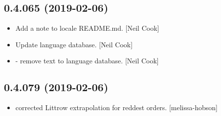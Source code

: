 \documentclass[a4paper,10pt,english]{report}
\begin{document}
\subsection{0.4.065 (2019-02-06)}
\label{\detokenize{misc/changelog:id193}}\begin{itemize}
\item {} 
Add a note to locale README.md. {[}Neil Cook{]}

\item {} 
Update language database. {[}Neil Cook{]}

\item {} 
 - remove text to language database. {[}Neil Cook{]}

\end{itemize}


\subsection{0.4.079 (2019-02-06)}
\label{\detokenize{misc/changelog:id194}}\begin{itemize}
\item {} 
 corrected Littrow extrapolation for reddest orders.
{[}melissa-hobson{]}

\end{itemize}
\end{document}

